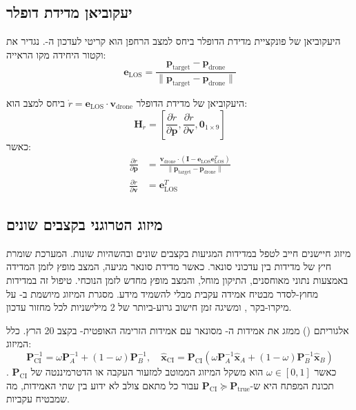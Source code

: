 \subsection{יעקוביאן מדידת דופלר}
\label{sec:ch05_doppler_jacobian}

היעקוביאן של פונקציית מדידת הדופלר ביחס למצב הרחפן הוא קריטי לעדכון ה-. נגדיר את וקטור היחידה מקו הראייה:
\begin{equation}
\mathbf{e}_{\text{LOS}} = \frac{\mathbf{p}_{\text{target}} - \mathbf{p}_{\text{drone}}}{\| \mathbf{p}_{\text{target}} - \mathbf{p}_{\text{drone}} \|}
\label{eq:ch05_los_vector}
\end{equation}

היעקוביאן של מדידת הדופלר $\dot{r} = \mathbf{e}_{\text{LOS}} \cdot \mathbf{v}_{\text{drone}}$ ביחס למצב הוא:
\begin{equation}
\mathbf{H}_{\dot{r}} = \left[ \frac{\partial \dot{r}}{\partial \mathbf{p}}, \frac{\partial \dot{r}}{\partial \mathbf{v}}, \mathbf{0}_{1 \times 9} \right]
\label{eq:ch05_doppler_jacobian}
\end{equation}
כאשר:
\begin{align}
\frac{\partial \dot{r}}{\partial \mathbf{p}} &= \frac{\mathbf{v}_{\text{drone}} \cdot (\mathbf{I} - \mathbf{e}_{\text{LOS}} \mathbf{e}_{\text{LOS}}^T)}{\| \mathbf{p}_{\text{target}} - \mathbf{p}_{\text{drone}} \|} \\
\frac{\partial \dot{r}}{\partial \mathbf{v}} &= \mathbf{e}_{\text{LOS}}^T
\label{eq:ch05_doppler_jacobian_parts}
\end{align}

\subsection{מיזוג הטרוגני בקצבים שונים}
\label{sec:ch05_asynchronous_fusion}

מיזוג חיישנים חייב לטפל במדידות המגיעות בקצבים שונים ובהשהיות שונות. המערכת שומרת חיץ של מדידות  בין עדכוני סונאר. כאשר מדידת סונאר מגיעה, המצב מופץ לזמן המדידה באמצעות נתוני  מאוחסנים, התיקון מוחל, והמצב מופץ מחדש לזמן הנוכחי. טיפול זה במדידות מחוץ-לסדר מבטיח אמידה עקבית מבלי להשמיד מידע. מסגרת המיזוג מיושמת ב- על מיקרו-בקר , ומשיגה זמן חישוב גרוע-ביותר של 2 מילישניות לכל מחזור עדכון.

אלגוריתם  () ממזג את אמידות ה- מסונאר עם אמידות הזרימה האופטית- בקצב 20 הרץ. כלל המיזוג:
\begin{equation}
\mathbf{P}_{\text{CI}}^{-1} = \omega \mathbf{P}_A^{-1} + (1 - \omega) \mathbf{P}_B^{-1}, \quad \hat{\mathbf{x}}_{\text{CI}} = \mathbf{P}_{\text{CI}} \left( \omega \mathbf{P}_A^{-1} \hat{\mathbf{x}}_A + (1 - \omega) \mathbf{P}_B^{-1} \hat{\mathbf{x}}_B \right)
\label{eq:ch05_covariance_intersection}
\end{equation}
כאשר $\omega \in [0,1]$ הוא משקל המיזוג הממוטב למזעור העקבה או הדטרמיננטה של $\mathbf{P}_{\text{CI}}$ \cite{Julier1997CovarianceIntersection}. תכונת המפתח היא ש-$\mathbf{P}_{\text{CI}} \succeq \mathbf{P}_{\text{true}}$ עבור כל מתאם צולב לא ידוע בין שתי האמידות, מה שמבטיח עקביות.

